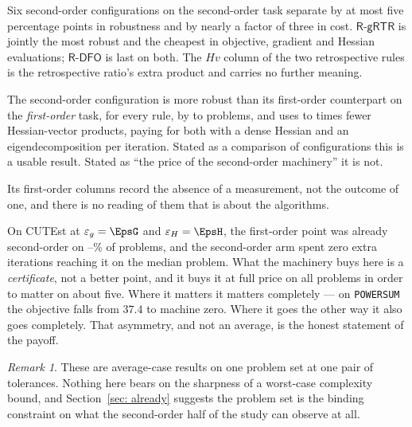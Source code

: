 \documentclass[11pt,a4paper]{article}
\providecommand{\Rdfo}{\textsf{R-DFO}}
\providecommand{\Rgrtr}{\textsf{R-gRTR}}
\theoremstyle{remark}
\newtheorem{remark}{Remark}
\begin{document}
\begin{description}[leftmargin=1.8em, style=nextline]
  \item[P1, without qualification.] Six second-order configurations on the
    second-order task separate by at most five percentage points in robustness and
    by nearly a factor of three in cost. $\Rgrtr$ is jointly the most robust and
    the cheapest in objective, gradient and Hessian evaluations; $\Rdfo$ is last
    on both. The $Hv$ column of the two retrospective rules is the retrospective
    ratio's extra product and carries no further meaning.
  \item[P2, with the confound named in the sentence.] The second-order
    configuration is more robust than its first-order counterpart on the
    \emph{first-order} task, for every rule, by \PtwoGainMin{} to \PtwoGainMax{}
    problems, and uses \PtwoHpMin{} to \PtwoHpMax{} times fewer Hessian-vector
    products, paying for both with a dense Hessian and an eigendecomposition per
    iteration. Stated as a comparison of configurations this is a usable result.
    Stated as ``the price of the second-order machinery'' it is not.
  \item[P3, not at all.] Its first-order columns record the absence of a
    measurement, not the outcome of one, and there is no reading of them that is
    about the algorithms.
  \item[The finding that reframes the campaign.] On CUTEst at
    $\varepsilon_g = \EpsG$ and $\varepsilon_H = \EpsH$, the first-order point was
    already second-order on \CurvAlreadyMin--\CurvAlreadyMax\% of problems, and
    the second-order arm spent zero extra iterations reaching it on the median
    problem. What the machinery buys here is a \emph{certificate}, not a better
    point, and it buys it at full price on all \NOpened{} problems in order to
    matter on about five. Where it matters it matters completely --- on
    \texttt{POWERSUM} the objective falls from $37.4$ to machine zero. Where it
    goes the other way it also goes completely. That asymmetry, and not an
    average, is the honest statement of the payoff.
\end{description}

\begin{remark}
These are average-case results on one problem set at one pair of tolerances.
Nothing here bears on the sharpness of a worst-case complexity bound, and
Section~\ref{sec: already} suggests the problem set is the binding constraint on
what the second-order half of the study can observe at all.
\end{remark}
\end{document}
